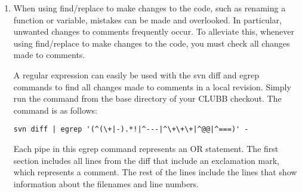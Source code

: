 \documentclass[letterpaper,12pt]{article}
\begin{document}
\begin{enumerate}
  {\bf C. Homeless Variables}

  There are some variables in the CLUBB code that don't have a definitive
  ``home". Rather, they just have numerous cardboard boxes scattered amongst the
  various different vertical levels.
 
  Generally, these are variables that are diagnosed based on nearly equal
  contributions from momentum-level variables and thermodynamic-level variables.
  A great example of this is Skewness of w. The skewness of w, Skw, equals
  \verb|wp3 / wp2^1.5|.  It is based on one thermodynamic-level variable, wp3,
  and one momentum-level variable, wp2. Thus, when calculating Skw on
  thermodynamic levels, \verb|Skw = wp3 / wp2_zt^1.5|, and when calculating Skw
  on momentum levels, \verb|Skw = wp3_zm / wp2^1.5|.  Two more great examples of
  this are eddy diffusivity, Kh, and time-scale, tau. Both are based on one
  thermodynamic-level variable, Lscale, and one momentum-level variable, em.

  When a homeless variable is at its cardboard box on momentum levels, a ``\_zm"
  extension is tacked onto it, and when it is at its cardboard box on
  thermodynamic levels, a ``\_zt" extension is tacked onto it. Thus, skewness of
  w is called Skw\_zt at thermodynamic levels and Skw\_zm at momentum levels.
  Likewise, eddy diffusivity and time-scale are Kh\_zt and tau\_zt,
  respectively, at thermodynamic levels, and Kh\_zm and tau\_zm, respectively,
  at momentum levels. 

\item  When using find/replace to make changes to the code, such as renaming a function or variable, mistakes can be made and overlooked. In particular, unwanted changes to comments frequently occur. To alleviate this, whenever using find/replace to make changes to the code, you must check all changes made to comments.

A regular expression can easily be used with the svn diff and egrep commands to find all changes made to comments in a local revision. Simply run the command from the base directory of your CLUBB checkout. The command is as follows:

\begin{verbatim}
svn diff | egrep '(^(\+|-).*!|^---|^\+\+\+|^@@|^===)' -
\end{verbatim}

Each pipe in this egrep command represents an OR statement. The first section includes all lines from the diff that include an exclamation mark, which represents a comment. The rest of the lines include the lines that show information about the filenames and line numbers.


\end{enumerate}
\end{document}
